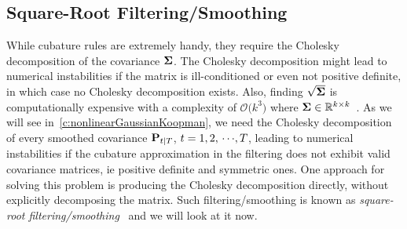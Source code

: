 	\subsection{Square-Root Filtering/Smoothing}
		While cubature rules are extremely handy, they require the Cholesky decomposition of the covariance \( \boldsymbol{\mathrm{\Sigma}} \). The Cholesky decomposition might lead to numerical instabilities if the matrix is ill-conditioned or even not positive definite, in which case no Cholesky decomposition exists. Also, finding \( \sqrt{\boldsymbol{\mathrm{\Sigma}}} \) is computationally expensive with a complexity of \( \mathcal{O}\big(k^3\big) \) where \( \boldsymbol{\mathrm{\Sigma}} \in \mathbb{R}^{k \times k} \)~\cite{ballardCommunicationoptimalParallelSequential2010}. As we will see in~\autoref{c:nonlinearGaussianKoopman}, we need the Cholesky decomposition of every smoothed covariance \( \boldsymbol{\mathrm{P}}_{t \vert T} \), \( t = 1, 2, \,\cdots\!, T \), leading to numerical instabilities if the cubature approximation in the filtering does not exhibit valid covariance matrices, \ac{ie} positive definite and symmetric ones. One approach for solving this problem is producing the Cholesky decomposition directly, without explicitly decomposing the matrix. Such filtering/smoothing is known as \emph{square-root filtering/smoothing}~\cite{vandermerweSquarerootUnscentedKalman2001,ruttenSquarerootUnscentedFiltering2013} and we will look at it now.

